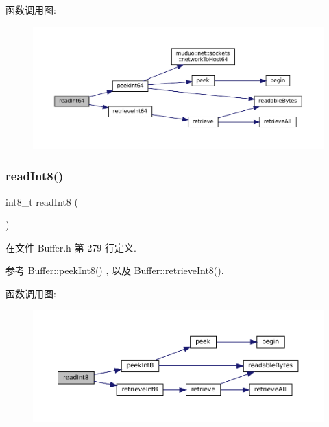 函数调用图\+:
\nopagebreak
\begin{figure}[H]
\begin{center}
\leavevmode
\includegraphics[width=350pt]{classmuduo_1_1net_1_1Buffer_a5b815d6984b81ae01f581f799c48582f_cgraph}
\end{center}
\end{figure}
\mbox{\label{classmuduo_1_1net_1_1Buffer_a24c9f312341ccfb47ae7a007ae32c39f}} 
\subsubsection{\texorpdfstring{read\+Int8()}{readInt8()}}
{\footnotesize\ttfamily int8\+\_\+t read\+Int8 (\begin{DoxyParamCaption}{ }\end{DoxyParamCaption})\hspace{0.3cm}{\ttfamily [inline]}}



在文件 Buffer.\+h 第 279 行定义.



参考 Buffer\+::peek\+Int8() , 以及 Buffer\+::retrieve\+Int8().

函数调用图\+:
\nopagebreak
\begin{figure}[H]
\begin{center}
\leavevmode
\includegraphics[width=350pt]{classmuduo_1_1net_1_1Buffer_a24c9f312341ccfb47ae7a007ae32c39f_cgraph}
\end{center}
\end{figure}
\mbox{\label{classmuduo_1_1net_1_1Buffer_a25a9cdb4fcb89f6e3ff071517bdc09e8}} 
